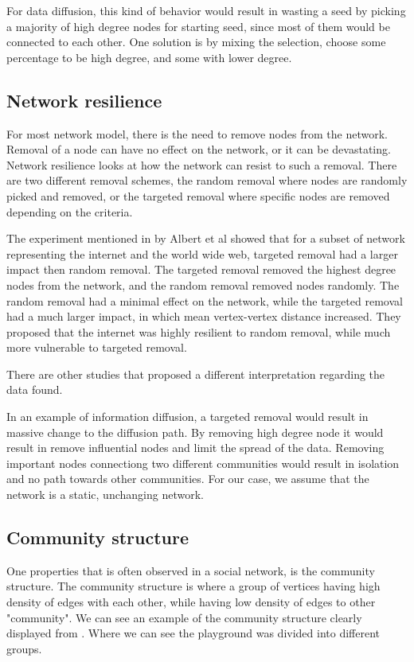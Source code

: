 For data diffusion, this kind of behavior would result in wasting a seed by picking a majority of high degree nodes for starting seed, since most of them would be connected to each other. One solution is by mixing the selection, choose some percentage to be high degree, and some with lower degree.

\subsection{Network resilience}
For most network model, there is the need to remove nodes from the network. Removal of a node can have no effect on the network, or it can be devastating. Network resilience looks at how the network can resist to such a removal. There are two different removal schemes, the random removal where nodes are randomly picked and removed, or the targeted removal where specific nodes are removed depending on the criteria. 

The experiment mentioned in  \cite{complexNetwork2003} by Albert et al showed that for a subset of network representing the internet and the world wide web, targeted removal had a larger impact then random removal. The targeted removal removed the highest degree nodes from the network, and the random removal removed nodes randomly. The random removal had a minimal effect on the network, while the targeted removal had a much larger impact, in which mean vertex-vertex distance increased. They proposed that the internet was highly resilient to random removal, while much more vulnerable to targeted removal. 

There are other studies that proposed a different interpretation regarding the data found.	

In an example of information diffusion, a targeted removal would result in massive change to the diffusion path. By removing high degree node it would result in remove influential nodes and limit the spread of the data. Removing important nodes connectiong two different communities would result in isolation and no path towards other communities. For our case, we assume that the network is a static, unchanging network. 

\subsection{Community structure}
One properties that is often observed in a social network, is the community structure. The community structure is where a group of vertices having high density of edges with each other, while having low density of edges to other "community". We can see an example of the community structure clearly displayed from  \cite{RaceInSchool}. Where we can see the playground was divided into different groups.

